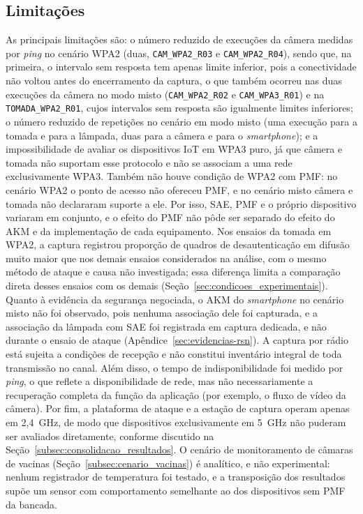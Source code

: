 \subsection{Limitações}
\label{subsec:limitacoes_resultados}

As principais limitações são: o número reduzido de execuções da câmera medidas por \textit{ping} no cenário WPA2 (duas, \texttt{CAM\_WPA2\_R03} e \texttt{CAM\_WPA2\_R04}), sendo que, na primeira, o intervalo sem resposta tem apenas limite inferior, pois a conectividade não voltou antes do encerramento da captura, o que também ocorreu nas duas execuções da câmera no modo misto (\texttt{CAM\_WPA2\_R02} e \texttt{CAM\_WPA3\_R01}) e na \texttt{TOMADA\_WPA2\_R01}, cujos intervalos sem resposta são igualmente limites inferiores; o número reduzido de repetições no cenário em modo misto (uma execução para a tomada e para a lâmpada, duas para a câmera e para o \textit{smartphone}); e a impossibilidade de avaliar os dispositivos IoT em WPA3 puro, já que câmera e tomada não suportam esse protocolo e não se associam a uma rede exclusivamente WPA3. Também não houve condição de WPA2 com PMF: no cenário WPA2 o ponto de acesso não ofereceu PMF, e no cenário misto câmera e tomada não declararam suporte a ele. Por isso, SAE, PMF e o próprio dispositivo variaram em conjunto, e o efeito do PMF não pôde ser separado do efeito do AKM e da implementação de cada equipamento. Nos ensaios da tomada em WPA2, a captura registrou proporção de quadros de desautenticação em difusão muito maior que nos demais ensaios considerados na análise, com o mesmo método de ataque e causa não investigada; essa diferença limita a comparação direta desses ensaios com os demais (Seção~\ref{sec:condicoes_experimentais}). Quanto à evidência da segurança negociada, o AKM do \textit{smartphone} no cenário misto não foi observado, pois nenhuma associação dele foi capturada, e a associação da lâmpada com SAE foi registrada em captura dedicada, e não durante o ensaio de ataque (Apêndice~\ref{sec:evidencias-rsn}). A captura por rádio está sujeita a condições de recepção e não constitui inventário integral de toda transmissão no canal. Além disso, o tempo de indisponibilidade foi medido por \textit{ping}, o que reflete a disponibilidade de rede, mas não necessariamente a recuperação completa da função da aplicação (por exemplo, o fluxo de vídeo da câmera). Por fim, a plataforma de ataque e a estação de captura operam apenas em 2,4~GHz, de modo que dispositivos exclusivamente em 5~GHz não puderam ser avaliados diretamente, conforme discutido na Seção~\ref{subsec:consolidacao_resultados}. O cenário de monitoramento de câmaras de vacinas (Seção~\ref{subsec:cenario_vacinas}) é analítico, e não experimental: nenhum registrador de temperatura foi testado, e a transposição dos resultados supõe um sensor com comportamento semelhante ao dos dispositivos sem PMF da bancada.



